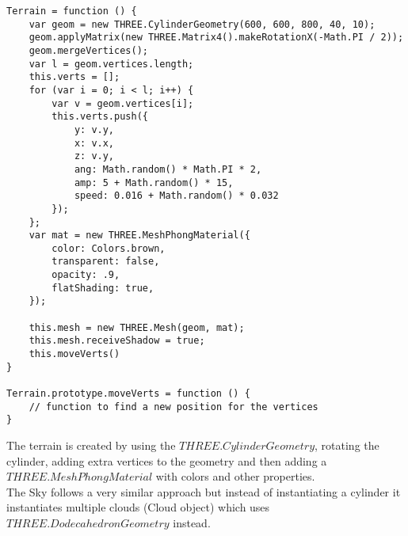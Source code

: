 \documentclass[a4paper,11pt]{article}
\begin{document}
\begin{verbatim}
Terrain = function () {
    var geom = new THREE.CylinderGeometry(600, 600, 800, 40, 10);
    geom.applyMatrix(new THREE.Matrix4().makeRotationX(-Math.PI / 2));
    geom.mergeVertices();
    var l = geom.vertices.length;
    this.verts = [];
    for (var i = 0; i < l; i++) {
        var v = geom.vertices[i];
        this.verts.push({
            y: v.y,
            x: v.x,
            z: v.y,
            ang: Math.random() * Math.PI * 2,
            amp: 5 + Math.random() * 15,
            speed: 0.016 + Math.random() * 0.032
        });
    };
    var mat = new THREE.MeshPhongMaterial({
        color: Colors.brown,
        transparent: false,
        opacity: .9,
        flatShading: true,
    });

    this.mesh = new THREE.Mesh(geom, mat);
    this.mesh.receiveShadow = true;
    this.moveVerts()
}

Terrain.prototype.moveVerts = function () {
    // function to find a new position for the vertices
}
\end{verbatim}
The terrain is created by using the $THREE.CylinderGeometry$, rotating the cylinder, adding extra vertices to the geometry and then adding a $THREE.MeshPhongMaterial$ with colors and other properties.\\
The Sky follows a very similar approach but instead of instantiating a cylinder it instantiates multiple clouds (Cloud object) which uses $THREE.DodecahedronGeometry$ instead.
\end{document}
